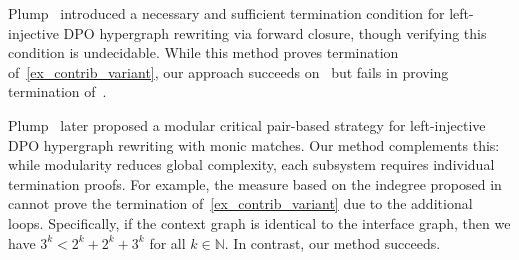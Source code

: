 Plump~\cite{plump1995ontermination} introduced a necessary and sufficient termination condition for left-injective DPO hypergraph rewriting via forward closure, though verifying this condition is undecidable. 
While this method proves termination of~\autoref{ex_contrib_variant}, our approach succeeds on~\cite[Example 3.8]{plump1995ontermination} but fails in proving termination of~\cite[Example 4.1]{plump1995ontermination}. 

Plump~\cite{plump2018modular} later proposed a modular critical pair-based strategy for left-injective DPO hypergraph rewriting with monic matches. 
Our method complements this: while modularity reduces global complexity, each subsystem requires individual termination proofs. For example, the measure based on the indegree proposed in~\cite{plump2018modular} cannot prove the termination of~\autoref{ex_contrib_variant} due to the additional loops. Specifically, if the context graph is identical to the interface graph, then we have $3^k < 2^k+2^k+3^k$ for all $k \in \mathbb{N}$. In contrast, our method succeeds.





